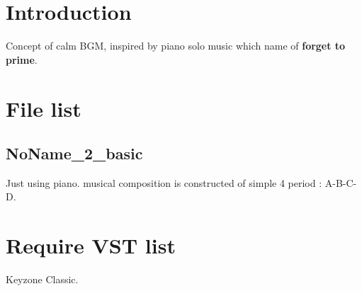 \documentclass{article}
\author{Seycho Han}
\date{XX XX 2012}
\begin{document}
\begin{CJK}{UTF8}{ipxm}

\section{Introduction}
Concept of calm BGM, inspired by piano solo music which name of \textbf{forget to prime}\cite{sakura}.
\\
\section{File list}
\subsection{NoName\_2\_basic}
Just using piano. musical composition is constructed of simple 4 period : A-B-C-D.
\\

\section{Require VST list}
Keyzone Classic\cite{keyzone}.
\\




\end{CJK}
\end{document}
